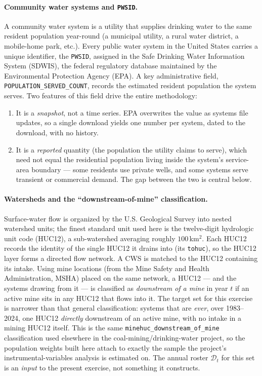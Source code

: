\documentclass[11pt]{article}
\newcommand{\PWSID}{\texttt{PWSID}}
\begin{document}
\paragraph{Community water systems and \PWSID.}
A community water system is a utility that supplies drinking water to the same
resident population year-round (a municipal utility, a rural water district, a
mobile-home park, etc.). Every public water system in the United States
carries a unique identifier, the \PWSID, assigned in the Safe Drinking Water
Information System (SDWIS), the federal regulatory database maintained by the
Environmental Protection Agency (EPA). A key administrative field,
\texttt{POPULATION\_SERVED\_COUNT}, records the estimated resident population
the system serves. Two features of this field drive the entire methodology:
\begin{enumerate}[leftmargin=2em]
  \item It is a \emph{snapshot}, not a time series. EPA overwrites the value
    as systems file updates, so a single download yields one number per
    system, dated to the download, with no history.
  \item It is a \emph{reported} quantity (the population the utility claims to
    serve), which need not equal the residential population living inside the
    system's service-area boundary --- some residents use private wells, and
    some systems serve transient or commercial demand. The gap between the
    two is central below.
\end{enumerate}

\paragraph{Watersheds and the ``downstream-of-mine'' classification.}
Surface-water flow is organized by the U.S. Geological Survey into nested
watershed units; the finest standard unit used here is the twelve-digit
hydrologic unit code (HUC12), a sub-watershed averaging roughly $100$\,km$^2$.
Each HUC12 records the identity of the single HUC12 it drains into (its
\texttt{tohuc}), so the HUC12 layer forms a directed flow network. A CWS is
matched to the HUC12 containing its intake. Using mine locations (from the
Mine Safety and Health Administration, MSHA) placed on the same network, a
HUC12 --- and the systems drawing from it --- is classified as \emph{downstream
of a mine} in year $t$ if an active mine sits in any HUC12 that flows into it.
The target set for this exercise is narrower than that general classification:
systems that are \emph{ever}, over 1983--2024, one HUC12 \emph{directly}
downstream of an active mine, with no intake in a mining HUC12 itself. This is
the same \texttt{minehuc\_downstream\_of\_mine} classification used elsewhere
in the coal-mining/drinking-water project, so the population weights built
here attach to exactly the sample the project's instrumental-variables
analysis is estimated on. The annual roster $\mathcal{D}_t$ for this set is an
\emph{input} to the present exercise, not something it constructs.
\end{document}
